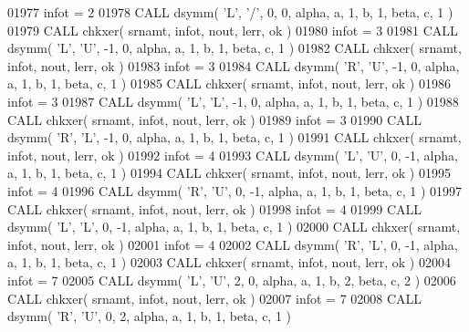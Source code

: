 \begin{DoxyCode}
01977       infot = 2
01978       \textcolor{keyword}{CALL }dsymm( \textcolor{stringliteral}{'L'}, \textcolor{stringliteral}{'/'}, 0, 0, alpha, a, 1, b, 1, beta, c, 1 )
01979       \textcolor{keyword}{CALL }chkxer( srnamt, infot, nout, lerr, ok )
01980       infot = 3
01981       \textcolor{keyword}{CALL }dsymm( \textcolor{stringliteral}{'L'}, \textcolor{stringliteral}{'U'}, -1, 0, alpha, a, 1, b, 1, beta, c, 1 )
01982       \textcolor{keyword}{CALL }chkxer( srnamt, infot, nout, lerr, ok )
01983       infot = 3
01984       \textcolor{keyword}{CALL }dsymm( \textcolor{stringliteral}{'R'}, \textcolor{stringliteral}{'U'}, -1, 0, alpha, a, 1, b, 1, beta, c, 1 )
01985       \textcolor{keyword}{CALL }chkxer( srnamt, infot, nout, lerr, ok )
01986       infot = 3
01987       \textcolor{keyword}{CALL }dsymm( \textcolor{stringliteral}{'L'}, \textcolor{stringliteral}{'L'}, -1, 0, alpha, a, 1, b, 1, beta, c, 1 )
01988       \textcolor{keyword}{CALL }chkxer( srnamt, infot, nout, lerr, ok )
01989       infot = 3
01990       \textcolor{keyword}{CALL }dsymm( \textcolor{stringliteral}{'R'}, \textcolor{stringliteral}{'L'}, -1, 0, alpha, a, 1, b, 1, beta, c, 1 )
01991       \textcolor{keyword}{CALL }chkxer( srnamt, infot, nout, lerr, ok )
01992       infot = 4
01993       \textcolor{keyword}{CALL }dsymm( \textcolor{stringliteral}{'L'}, \textcolor{stringliteral}{'U'}, 0, -1, alpha, a, 1, b, 1, beta, c, 1 )
01994       \textcolor{keyword}{CALL }chkxer( srnamt, infot, nout, lerr, ok )
01995       infot = 4
01996       \textcolor{keyword}{CALL }dsymm( \textcolor{stringliteral}{'R'}, \textcolor{stringliteral}{'U'}, 0, -1, alpha, a, 1, b, 1, beta, c, 1 )
01997       \textcolor{keyword}{CALL }chkxer( srnamt, infot, nout, lerr, ok )
01998       infot = 4
01999       \textcolor{keyword}{CALL }dsymm( \textcolor{stringliteral}{'L'}, \textcolor{stringliteral}{'L'}, 0, -1, alpha, a, 1, b, 1, beta, c, 1 )
02000       \textcolor{keyword}{CALL }chkxer( srnamt, infot, nout, lerr, ok )
02001       infot = 4
02002       \textcolor{keyword}{CALL }dsymm( \textcolor{stringliteral}{'R'}, \textcolor{stringliteral}{'L'}, 0, -1, alpha, a, 1, b, 1, beta, c, 1 )
02003       \textcolor{keyword}{CALL }chkxer( srnamt, infot, nout, lerr, ok )
02004       infot = 7
02005       \textcolor{keyword}{CALL }dsymm( \textcolor{stringliteral}{'L'}, \textcolor{stringliteral}{'U'}, 2, 0, alpha, a, 1, b, 2, beta, c, 2 )
02006       \textcolor{keyword}{CALL }chkxer( srnamt, infot, nout, lerr, ok )
02007       infot = 7
02008       \textcolor{keyword}{CALL }dsymm( \textcolor{stringliteral}{'R'}, \textcolor{stringliteral}{'U'}, 0, 2, alpha, a, 1, b, 1, beta, c, 1 )

\end{DoxyCode}
